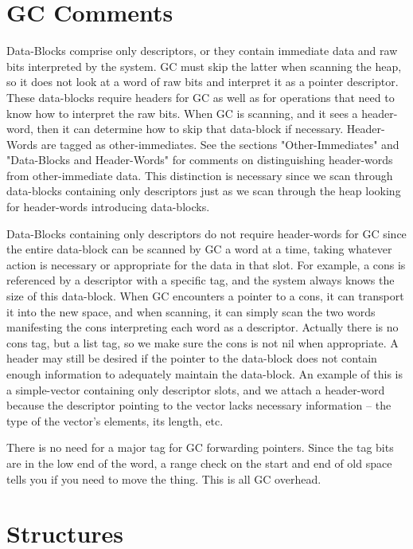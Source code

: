 
\section{GC Comments}

Data-Blocks comprise only descriptors, or they contain immediate data and raw
bits interpreted by the system.  GC must skip the latter when scanning the
heap, so it does not look at a word of raw bits and interpret it as a pointer
descriptor.  These data-blocks require headers for GC as well as for operations
that need to know how to interpret the raw bits.  When GC is scanning, and it
sees a header-word, then it can determine how to skip that data-block if
necessary.  Header-Words are tagged as other-immediates.  See the sections
"Other-Immediates" and "Data-Blocks and Header-Words" for comments on
distinguishing header-words from other-immediate data.  This distinction is
necessary since we scan through data-blocks containing only descriptors just as
we scan through the heap looking for header-words introducing data-blocks.

Data-Blocks containing only descriptors do not require header-words for GC
since the entire data-block can be scanned by GC a word at a time, taking
whatever action is necessary or appropriate for the data in that slot.  For
example, a cons is referenced by a descriptor with a specific tag, and the
system always knows the size of this data-block.  When GC encounters a pointer
to a cons, it can transport it into the new space, and when scanning, it can
simply scan the two words manifesting the cons interpreting each word as a
descriptor.  Actually there is no cons tag, but a list tag, so we make sure the
cons is not nil when appropriate.  A header may still be desired if the pointer
to the data-block does not contain enough information to adequately maintain
the data-block.  An example of this is a simple-vector containing only
descriptor slots, and we attach a header-word because the descriptor pointing
to the vector lacks necessary information -- the type of the vector's elements,
its length, etc.

There is no need for a major tag for GC forwarding pointers.  Since the tag
bits are in the low end of the word, a range check on the start and end of old
space tells you if you need to move the thing.  This is all GC overhead.



\section{Structures}

